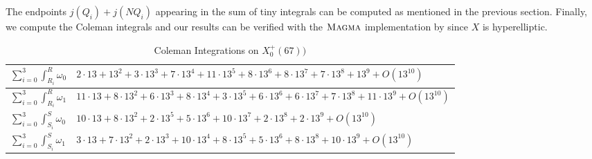 \begin{itemize}
The endpoints $j(Q_i) + j(NQ_i)$ appearing in the sum of tiny integrals can be computed as mentioned in the previous section. Finally, we compute the Coleman integrals and our results can be verified with the $\textsc{Magma}{}$ implementation by \cite{balatuit} since $X$ is hyperelliptic. 

\begin{table}[h]

    \centering
    \begin{tabular}{|l|l|}
    \hline
    \rule{0pt}{4ex}    

        $\sum_{i=0}^{3}\int^R_{R_i} \omega_0 $    & $2\cdot 13 + 13^2 + 3\cdot 13^3 + 7\cdot 13^4 + 11\cdot 13^5 + 8\cdot 13^6 + 8\cdot 13^7 + 7\cdot 13^8 + 13^9 +  O(13^{10})$ 
            \rule{0pt}{4ex} \\
\hline
            \rule{0pt}{4ex}
        $\sum_{i=0}^{3}\int^R_{R_i} \omega_1 $  & $11\cdot 13 + 8\cdot 13^2 + 6\cdot 13^3 + 8\cdot 13^4 + 3\cdot 13^5+ 6\cdot 13^6 + 6\cdot 13^7 + 7\cdot 13^8 + 11\cdot 13^9 + O(13^{10}) $
            \rule{0pt}{4ex}
\\\hline
            \rule{0pt}{4ex}
       $\sum_{i=0}^{3}\int^S_{S_i} \omega_0 $ & $10\cdot  13 + 8\cdot 13^2 + 2\cdot 13^5 + 5\cdot 13^6 + 10\cdot 13^7 + 2\cdot 13^8 + 2\cdot 13^9+ O(13^{10}) $   \rule{0pt}{4ex}    
\\\hline
           \rule{0pt}{4ex}    
        $\sum_{i=0}^{3}\int^S_{S_i} \omega_1 $ &  $3\cdot 13 + 7\cdot 13^2 + 2\cdot 13^3 + 10\cdot 13^4 + 8\cdot 13^5+ 5\cdot 13^6 + 8\cdot 13^8 + 10\cdot 13^9+ O(13^{10}) $   \rule{0pt}{4ex}    
\\\hline
        
    \end{tabular}
    \caption{Coleman Integrations on $X_0^+(67))$}
    \label{table:X_0^+(67)_results}
\end{table}

\end{itemize}
